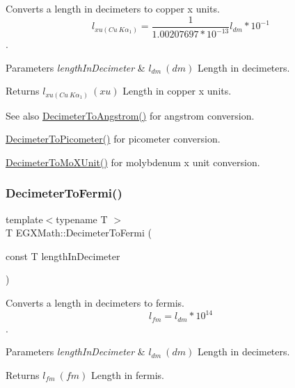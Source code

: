 Converts a length in decimeters to copper x units. \[ l_{xu(Cu\ K\alpha_1)}= \frac{1}{1.00207697*10^{-13}} l_{dm} * 10^{-1}\]. 


\begin{DoxyParams}{Parameters}
{\em length\+In\+Decimeter} & $ l_{dm}\ (dm)$ Length in decimeters. \\
\hline
\end{DoxyParams}
\begin{DoxyReturn}{Returns}
$ l_{xu(Cu\ K\alpha_1)}\ (xu)$ Length in copper x units. 
\end{DoxyReturn}
\begin{DoxySeeAlso}{See also}
\mbox{\hyperlink{group___e_g_x_math-_conversions-_length_conversions-_s_i-_decimeter-_non-_s_i_gaffa5876e4f15bc859c369e8bfb9e4183}{Decimeter\+To\+Angstrom()}} for angstrom conversion. 

\mbox{\hyperlink{group___e_g_x_math-_conversions-_length_conversions-_s_i-_decimeter-_s_i_gaac5fa4b7b538abe2d19f33e131e9bbde}{Decimeter\+To\+Picometer()}} for picometer conversion. 

\mbox{\hyperlink{group___e_g_x_math-_conversions-_length_conversions-_s_i-_decimeter-_non-_s_i_ga609f53e09c9a767639da3ad72905bb71}{Decimeter\+To\+Mo\+X\+Unit()}} for molybdenum x unit conversion. 
\end{DoxySeeAlso}
\mbox{\label{group___e_g_x_math-_conversions-_length_conversions-_s_i-_decimeter-_non-_s_i_ga2163b07afe9c89c1a1150516f615ef2a}} 
\subsubsection{\texorpdfstring{Decimeter\+To\+Fermi()}{DecimeterToFermi()}}
{\footnotesize\ttfamily template$<$typename T $>$ \\
T E\+G\+X\+Math\+::\+Decimeter\+To\+Fermi (\begin{DoxyParamCaption}\item[{const T}]{length\+In\+Decimeter }\end{DoxyParamCaption})}



Converts a length in decimeters to fermis. \[ l_{fm}=l_{dm} * 10^{14} \]. 


\begin{DoxyParams}{Parameters}
{\em length\+In\+Decimeter} & $ l_{dm}\ (dm)$ Length in decimeters. \\
\hline
\end{DoxyParams}
\begin{DoxyReturn}{Returns}
$ l_{fm}\ (fm)$ Length in fermis. 
\end{DoxyReturn}
\mbox{\label{group___e_g_x_math-_conversions-_length_conversions-_s_i-_decimeter-_non-_s_i_gaebafc6e167156bb5158e5d335b25334b}} 
